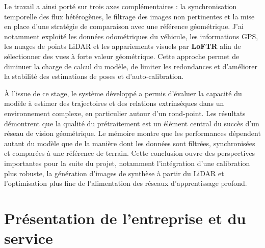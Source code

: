 \documentclass[12pt,a4paper,oneside]{report}
\begin{document}
Le travail a ainsi porté sur trois axes complémentaires : la synchronisation temporelle des flux hétérogènes, le filtrage des images non pertinentes et la mise en place d'une stratégie de comparaison avec une référence géométrique. J'ai notamment exploité les données odométriques du véhicule, les informations GPS, les nuages de points LiDAR et les appariements visuels par \textbf{LoFTR} afin de sélectionner des vues à forte valeur géométrique. Cette approche permet de diminuer la charge de calcul du modèle, de limiter les redondances et d'améliorer la stabilité des estimations de poses et d'auto-calibration.

À l'issue de ce stage, le système développé a permis d'évaluer la capacité du modèle à estimer des trajectoires et des relations extrinsèques dans un environnement complexe, en particulier autour d'un rond-point. Les résultats démontrent que la qualité du prétraitement est un élément central du succès d'un réseau de vision géométrique. Le mémoire montre que les performances dépendent autant du modèle que de la manière dont les données sont filtrées, synchronisées et comparées à une référence de terrain. Cette conclusion ouvre des perspectives importantes pour la suite du projet, notamment l'intégration d'une calibration plus robuste, la génération d'images de synthèse à partir du LiDAR et l'optimisation plus fine de l'alimentation des réseaux d'apprentissage profond.

\newpage

\thispagestyle{empty}
\tableofcontents

\newpage


\chapter{Présentation de l'entreprise et du service}
\end{document}
